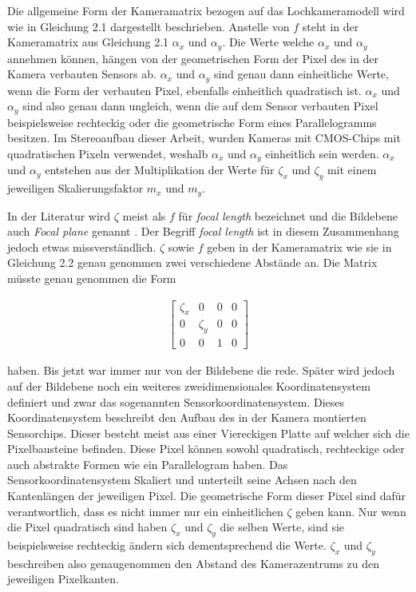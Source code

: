 Die allgemeine Form der Kameramatrix bezogen auf das Lochkameramodell wird wie in Gleichung 2.1 dargestellt beschrieben. Anstelle von $f$ steht in der Kameramatrix aus Gleichung 2.1 $\alpha_x$ und $\alpha_y$. Die Werte welche $\alpha_x$ und $\alpha_y$ annehmen können, hängen von der geometrischen Form der Pixel des in der Kamera verbauten Sensors ab\cite{HZ,Photonik}.  $\alpha_x$ und $\alpha_y$ sind genau dann einheitliche Werte, wenn die Form der verbauten Pixel, ebenfalls einheitlich quadratisch ist.
$\alpha_x$ und $\alpha_y$ sind also genau dann ungleich, wenn die auf dem Sensor verbauten Pixel beispielsweise rechteckig oder die geometrische Form eines Parallelogramms besitzen\cite{HZ}. Im Stereoaufbau dieser Arbeit, wurden Kameras mit CMOS-Chips mit quadratischen Pixeln verwendet, weshalb $\alpha_x$ und $\alpha_y$ einheitlich sein werden. $\alpha_x$ und $\alpha_y$ entstehen aus der Multiplikation der Werte für $\zeta_x$ und $\zeta_y$ mit einem jeweiligen Skalierungsfaktor $m_x$ und $m_y$. 

In der Literatur  wird $\zeta$ meist als $f$ für \textit{focal length} bezeichnet und die Bildebene auch \textit{Focal plane} genannt \cite{HZ}. Der Begriff \textit{focal length} ist in diesem Zusammenhang jedoch etwas missverständlich. $\zeta$ sowie $f$ geben in der Kameramatrix wie sie in Gleichung 2.2 genau genommen zwei verschiedene Abstände an. Die Matrix müsste genau genommen die Form

\begin{gather*}
\begin{bmatrix}
\zeta_x&0&0&0\\
0&\zeta_y&0&0\\
0&0&1&0
\end{bmatrix}
\end{gather*}

haben. Bis jetzt war immer nur von der Bildebene die rede. Später wird jedoch auf der Bildebene noch ein weiteres zweidimensionales Koordinatensystem definiert und zwar das sogenannten Sensorkoordinatensystem. Dieses Koordinatensystem beschreibt den Aufbau des in der Kamera montierten Sensorchips. Dieser besteht meist aus einer Viereckigen Platte auf welcher sich die Pixelbausteine befinden. Diese Pixel können sowohl quadratisch, rechteckige oder auch abstrakte Formen wie ein Parallelogram haben. Das Sensorkoordinatensystem Skaliert und unterteilt seine Achsen nach den Kantenlängen der jeweiligen Pixel. Die geometrische Form dieser Pixel sind dafür verantwortlich, dass es nicht immer nur ein einheitlichen $\zeta$ geben kann. Nur wenn die Pixel quadratisch sind haben  $\zeta_x$ und $\zeta_y$ die selben Werte, sind sie beispielsweise rechteckig ändern sich dementsprechend die Werte. $\zeta_x$ und $\zeta_y$ beschreiben also genaugenommen den Abstand des Kamerazentrums zu den jeweiligen Pixelkanten.\\

